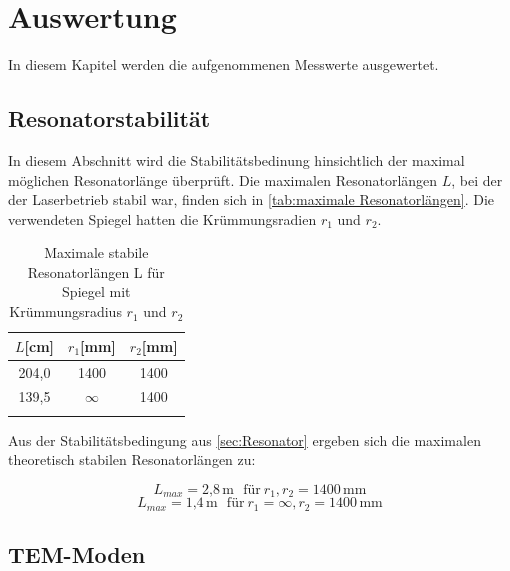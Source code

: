 


\section{Auswertung}
\label{sec:auswertung}

In diesem Kapitel werden die aufgenommenen Messwerte ausgewertet.





\subsection{Resonatorstabilität}
\label{sec:resonatorstabilität}


In diesem Abschnitt wird die Stabilitätsbedinung hinsichtlich der maximal möglichen Resonatorlänge überprüft.
Die maximalen Resonatorlängen $L$, bei der der Laserbetrieb stabil war, finden sich in \autoref{tab:maximale Resonatorlängen}. 
Die verwendeten Spiegel hatten die Krümmungsradien $r_1$ und $r_2$.

\begin{table}
\centering
\caption{Maximale stabile Resonatorlängen L für Spiegel mit Krümmungsradius $r_1$ und $r_2$}
\begin{tabular}{c c c}
\toprule
{$L$[cm]} & {$r_1$[mm]} & {$r_2$[mm]}\\
\midrule
204,0  &  1400 & 1400\\
139,5  &  $\infty$ & 1400\\
\bottomrule
\label{tab:maximale Resonatorlängen}
\end{tabular}
\end{table}



Aus der Stabilitätsbedingung aus \autoref{sec:Resonator} ergeben sich die maximalen theoretisch stabilen Resonatorlängen zu:

\begin{equation}
L_{max} = \text{2,8}\,\text{m} \ \ \ \text{für}\  r_1, r_2 = 1400\,\text{mm}
\label{eq:Lmax1}
\end{equation}
\begin{equation}
L_{max} = \text{1,4}\,\text{m} \ \ \ \text{für}\  r_1 = \infty, r_2 = 1400\,\text{mm}
\label{eq:Lmax2}
\end{equation}









\subsection{TEM-Moden}
\label{sec:TEM-Moden}

